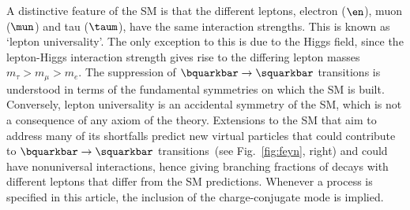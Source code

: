 A distinctive feature of the SM is that the different leptons, electron ($\en$), muon ($\mun$) and tau ($\taum$),
 have the same interaction strengths. This is known as ‘lepton universality’. The only exception to this is due to the Higgs field, since the lepton-Higgs interaction strength gives rise to the differing lepton masses $m_{\tau}>m_{\mu}>m_e$. 
The suppression of $\bquarkbar \to \squarkbar$ transitions is understood in terms of the fundamental symmetries on which the SM is built. Conversely, lepton universality is an accidental symmetry of the SM, which is not a consequence of any axiom of the theory. Extensions to the SM that aim to address many of its shortfalls predict new virtual particles that could contribute to $\bquarkbar \to \squarkbar$ transitions~(see Fig.~\ref{fig:feyn}, right) and could have nonuniversal interactions, hence giving branching fractions of \BuKll
 decays with different leptons that differ from the SM predictions. Whenever a process is specified in this article, the inclusion of the charge-conjugate mode is implied.


